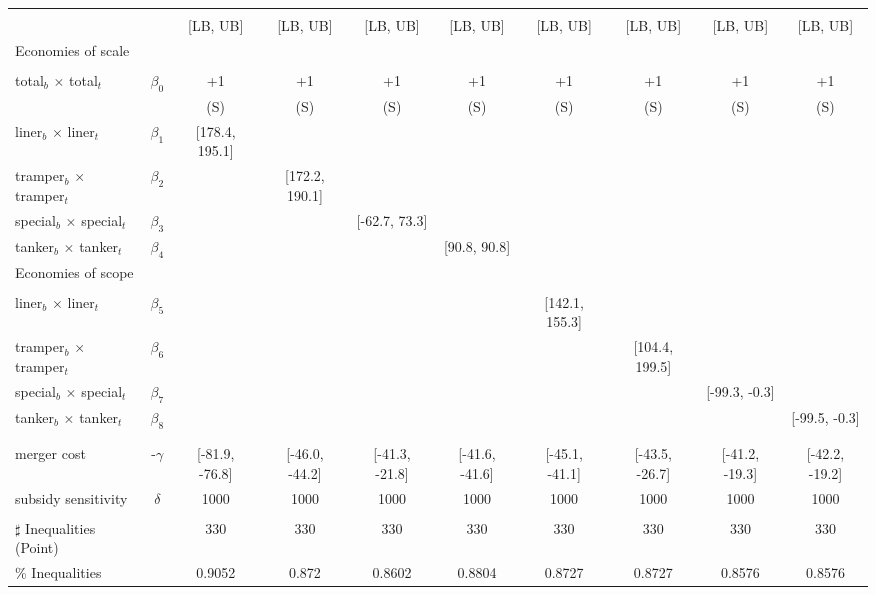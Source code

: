 \begin{tabular}{@{\extracolsep{5pt}}lccccccccc}
\toprule 
 &  &  &  &  &  &  &  &  &  \\
 &  & [LB, UB] & [LB, UB] & [LB, UB] & [LB, UB] & [LB, UB] & [LB, UB] & [LB, UB] & [LB, UB] \\
\midrule 
Economies of scale &  &  &  &  &  &  &  \\
 &  &  &  &  &  &  &  &  \\
total$_{b}$ $\times$ total$_{t}$ & $\beta_0$ & +1 & +1 & +1 & +1 & +1 & +1 & +1 & +1 \\
 &  & (S) & (S) & (S) & (S) & (S) & (S) & (S) & (S) \\
liner$_{b}$ $\times$ liner$_{t}$ & $\beta_1$ & [178.4, 195.1] &  &  &  &  &  &  &  \\
tramper$_{b}$ $\times$ tramper$_{t}$ & $\beta_2$ &  & [172.2, 190.1] &  &  &  &  &  &  \\
special$_{b}$ $\times$ special$_{t}$ & $\beta_3$ &  &  & [-62.7, 73.3] &  &  &  &  &  \\
tanker$_{b}$ $\times$ tanker$_{t}$ & $\beta_4$ &  &  &  & [90.8, 90.8] &  &  &  &  \\
Economies of scope &  &  &  &  &  &  &  &  &  \\
 &  &  &  &  &  &  &  &  &  \\
liner$_{b}$ $\times$ liner$_{t}$ & $\beta_5$ &  &  &  &  & [142.1, 155.3] &  &  &  \\
tramper$_{b}$ $\times$ tramper$_{t}$ & $\beta_6$ &  &  &  &  &  & [104.4, 199.5] &  &  \\
special$_{b}$ $\times$ special$_{t}$ & $\beta_7$ &  &  &  &  &  &  & [-99.3, -0.3] &  \\
tanker$_{b}$ $\times$ tanker$_{t}$ & $\beta_8$ &  &  &  &  &  &  &  & [-99.5, -0.3] \\
 &  &  &  &  &  &  &  &  &  \\
 &  &  &  &  &  &  &  &  &  \\
merger cost & -$\gamma$ & [-81.9, -76.8] & [-46.0, -44.2] & [-41.3, -21.8] & [-41.6, -41.6] & [-45.1, -41.1] & [-43.5, -26.7] & [-41.2, -19.3] & [-42.2, -19.2] \\
subsidy sensitivity & $\delta$ & 1000 & 1000 & 1000 & 1000 & 1000 & 1000 & 1000 & 1000 \\
 &  &  &  &  &  &  &  &  &  \\
\hline 
$\sharp$ Inequalities (Point) &  & 330 & 330 & 330 & 330 & 330 & 330 & 330 & 330 \\
\% Inequalities &  & 0.9052 & 0.872 & 0.8602 & 0.8804 & 0.8727 & 0.8727 & 0.8576 & 0.8576 \\
\bottomrule 
\end{tabular}
